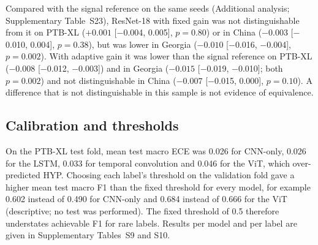 \documentclass{wlscirep}
\begin{document}
Compared with the signal reference on the same seeds (Additional analysis; Supplementary Table~S23), ResNet-18 with fixed gain was not distinguishable from it on PTB-XL ($+0.001$ [$-$0.004, 0.005], $p=0.80$) or in China ($-0.003$ [$-$0.010, 0.004], $p=0.38$), but was lower in Georgia ($-0.010$ [$-$0.016, $-$0.004], $p=0.002$). With adaptive gain it was lower than the signal reference on PTB-XL ($-0.008$ [$-$0.012, $-$0.003]) and in Georgia ($-0.015$ [$-$0.019, $-$0.010]; both $p=0.002$) and not distinguishable in China ($-0.007$ [$-$0.015, 0.000], $p=0.10$). A difference that is not distinguishable in this sample is not evidence of equivalence.

\subsection*{Calibration and thresholds}
On the PTB-XL test fold, mean test macro ECE was 0.026 for CNN-only, 0.026 for the LSTM, 0.033 for temporal convolution and 0.046 for the ViT, which over-predicted HYP. Choosing each label's threshold on the validation fold gave a higher mean test macro F1 than the fixed threshold for every model, for example 0.602 instead of 0.490 for CNN-only and 0.684 instead of 0.666 for the ViT (descriptive; no test was performed). The fixed threshold of 0.5 therefore understates achievable F1 for rare labels. Results per model and per label are given in Supplementary Tables~S9 and S10.
\end{document}

